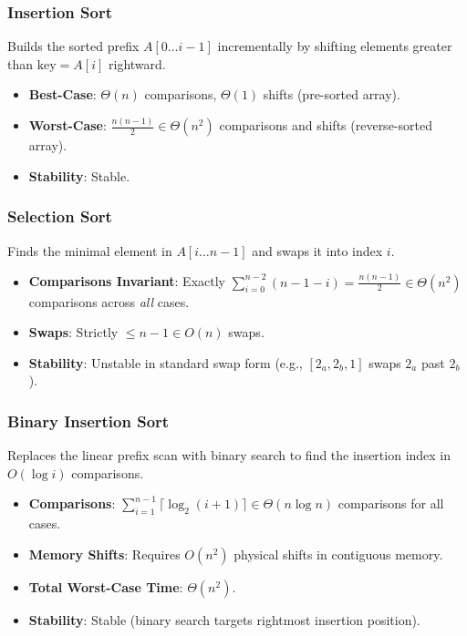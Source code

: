 \documentclass[11pt,a4paper]{article}
\theoremstyle{definition}
\theoremstyle{plain}
\theoremstyle{remark}
\begin{document}
\subsubsection{Insertion Sort}
Builds the sorted prefix $A[0 \dots i-1]$ incrementally by shifting elements greater than $\text{key} = A[i]$ rightward.
\begin{itemize}
    \item \textbf{Best-Case}: $\Theta(n)$ comparisons, $\Theta(1)$ shifts (pre-sorted array).
    \item \textbf{Worst-Case}: $\frac{n(n-1)}{2} \in \Theta(n^2)$ comparisons and shifts (reverse-sorted array).
    \item \textbf{Stability}: Stable.
\end{itemize}

\subsubsection{Selection Sort}
Finds the minimal element in $A[i \dots n-1]$ and swaps it into index $i$.
\begin{itemize}
    \item \textbf{Comparisons Invariant}: Exactly $\sum_{i=0}^{n-2} (n - 1 - i) = \frac{n(n-1)}{2} \in \Theta(n^2)$ comparisons across \textit{all} cases.
    \item \textbf{Swaps}: Strictly $\le n - 1 \in O(n)$ swaps.
    \item \textbf{Stability}: Unstable in standard swap form (e.g., $[2_a, 2_b, 1]$ swaps $2_a$ past $2_b$).
\end{itemize}

\subsubsection{Binary Insertion Sort}
Replaces the linear prefix scan with binary search to find the insertion index in $O(\log i)$ comparisons.
\begin{itemize}
    \item \textbf{Comparisons}: $\sum_{i=1}^{n-1} \lceil \log_2(i+1) \rceil \in \Theta(n \log n)$ comparisons for all cases.
    \item \textbf{Memory Shifts}: Requires $O(n^2)$ physical shifts in contiguous memory.
    \item \textbf{Total Worst-Case Time}: $\Theta(n^2)$.
    \item \textbf{Stability}: Stable (binary search targets rightmost insertion position).
\end{itemize}
\end{document}
